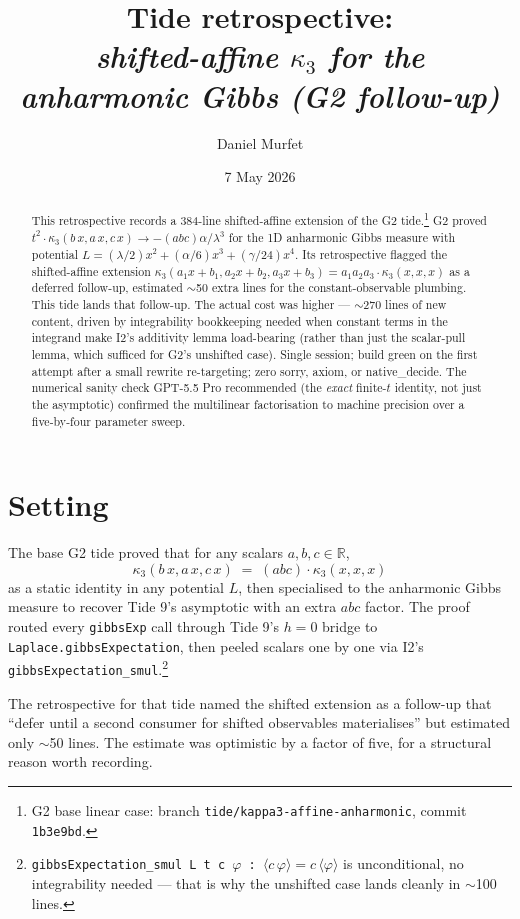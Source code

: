 \documentclass[11pt]{article}
\title{Tide retrospective:\\\emph{shifted-affine $\kappa_3$ for the
anharmonic Gibbs (G2 follow-up)}}
\author{Daniel Murfet}
\date{7 May 2026}
\begin{document}
\maketitle

\begin{abstract}
This retrospective records a 384-line shifted-affine extension of
the G2 tide.\footnote{G2 base linear case: branch
\texttt{tide/kappa3-affine-anharmonic}, commit \texttt{1b3e9bd}.}
G2 proved
$t^2 \cdot \kappa_3(b\,x, a\,x, c\,x) \to -(abc)\alpha/\lambda^3$ for
the 1D anharmonic Gibbs measure with potential $L = (\lambda/2)x^2 +
(\alpha/6)x^3 + (\gamma/24)x^4$. Its retrospective flagged the
shifted-affine extension
$\kappa_3(a_1 x + b_1, a_2 x + b_2, a_3 x + b_3) = a_1 a_2 a_3 \cdot
\kappa_3(x, x, x)$ as a deferred follow-up, estimated $\sim$50 extra
lines for the constant-observable plumbing. This tide lands that
follow-up. The actual cost was higher — $\sim$270 lines of new
content, driven by integrability bookkeeping needed when constant
terms in the integrand make I2's additivity lemma load-bearing
(rather than just the scalar-pull lemma, which sufficed for G2's
unshifted case). Single session; build green on the first attempt
after a small rewrite re-targeting; zero sorry, axiom, or
native\_decide. The numerical sanity check GPT-5.5 Pro recommended
(the \emph{exact} finite-$t$ identity, not just the asymptotic)
confirmed the multilinear factorisation to machine precision over a
five-by-four parameter sweep.
\end{abstract}

\section{Setting}

The base G2 tide proved that for any scalars $a, b, c \in
\mathbb{R}$,
\[
  \kappa_3(b\,x, a\,x, c\,x) \;=\; (abc) \cdot \kappa_3(x, x, x)
\]
as a static identity in any potential $L$, then specialised to the
anharmonic Gibbs measure to recover Tide 9's asymptotic with an extra
$abc$ factor. The proof routed every \texttt{gibbsExp} call through
Tide 9's $h = 0$ bridge to \texttt{Laplace.gibbsExpectation}, then
peeled scalars one by one via I2's
\texttt{gibbsExpectation\_smul}.\footnote{\texttt{gibbsExpectation\_smul
L t c $\varphi$ : $\langle c\,\varphi\rangle = c\,\langle
\varphi\rangle$} is unconditional, no integrability needed — that is
why the unshifted case lands cleanly in $\sim$100 lines.}

The retrospective for that tide named the shifted extension as a
follow-up that ``defer until a second consumer for shifted observables
materialises'' but estimated only $\sim$50 lines. The estimate was
optimistic by a factor of five, for a structural reason worth
recording.
\end{document}
